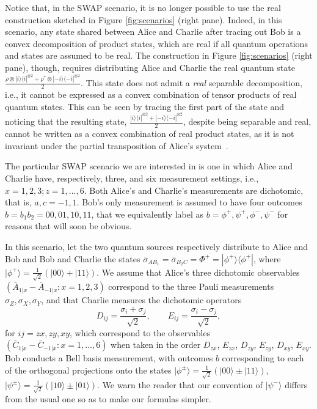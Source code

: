 \documentclass[onecolumn,prx,amsmath,amssymb,12pt]{revtex4-2}
\def\be{\begin{equation}}
\def\ee{\end{equation}}
\def\bra#1{\langle#1|} \def\ket#1{|#1\rangle}
\def\proj#1{\ket{#1}\!\bra{#1}}
\begin{document}
\begin{appendix}
Notice that, in the SWAP scenario, it is no longer possible to use the real construction sketched in Figure \ref{fig:scenarios} (right pane). Indeed, in this scenario, any state shared between Alice and Charlie after tracing out Bob is a convex decomposition of product states, which are real if all quantum operations and states are assumed to be real. The construction in Figure \ref{fig:scenarios} (right pane), though, requires distributing Alice and Charlie the real quantum state $\frac{\rho\otimes\proj{i}^{\otimes 2}+\rho^*\otimes\proj{-i}^{\otimes 2}}{2}$. This state does not admit a \emph{real} separable decomposition, i.e., it cannot be expressed as a convex combination of tensor products of real quantum states. This can be seen by tracing the first part of the state and noticing that the resulting state, $\frac{\proj{i}^{\otimes 2}+\proj{-i}^{\otimes 2}}{2}$, despite being separable and real, cannot be written as a convex combination of real product states, as it is not invariant under the partial transposition of Alice's system~\cite{real_entanglement}.


The particular SWAP scenario we are interested in is one in which Alice and Charlie have, respectively, three, and six measurement settings, i.e., $x=1,2,3; z=1,...,6$. Both Alice's and Charlie's measurements are dichotomic, that is, $a,c=-1,1$. Bob's only measurement is assumed to have four outcomes $b=b_1b_2=00,01,10,11$, that we equivalently label as $b=\phi^+,\psi^+,\phi^-,\psi^-$ for reasons that will soon be obvious. 

In this scenario, let the two quantum sources respectively distribute to Alice and Bob and Bob and Charlie the states $\bar{\sigma}_{AB_1}=\bar{\sigma}_{B_2C}=\Phi^+=\proj{\phi^+}$, where $\ket{\phi^+}=\frac{1}{\sqrt{2}}(\ket{00}+\ket{11})$. We assume that Alice's three dichotomic observables $(\bar{A}_{1|x}-\bar{A}_{-1|x}:x=1,2,3)$ correspond to the three Pauli measurements $\sigma_Z,\sigma_X,\sigma_Y$, and that Charlie measures the dichotomic operators
\be
D_{ij}=\frac{\sigma_i+\sigma_j}{\sqrt{2}}, \qquad E_{ij}=\frac{\sigma_i-\sigma_j}{\sqrt{2}},
\ee
\noindent for $ij=zx,zy,xy$, which correspond to the observables $(\bar{C}_{1|x}-\bar{C}_{-1|x}:x=1,\ldots,6)$ when taken in the order $D_{zx}$, $E_{zx}$, $D_{zy}$, $E_{zy}$, $D_{xy}$, $E_{xy}$. Bob conducts a Bell basis measurement, with outcomes $b$ corresponding to each of the orthogonal projections onto the states $\ket{\phi^{\pm}}=\frac{1}{\sqrt{2}}(\ket{00}\pm\ket{11})$, $\ket{\psi^{\pm}}=\frac{1}{\sqrt{2}}(\ket{10}\pm\ket{01})$. We warn the reader that our convention of $\ket{\psi^-}$ differs from the usual one so as to make our formulas simpler. 


\end{appendix}
\end{document}
